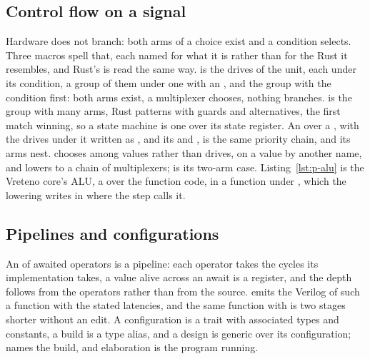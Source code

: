\documentclass[journal,9pt]{IEEEtran}
\begin{document}
\subsection{Control flow on a signal}

Hardware does not branch: both arms of a choice exist and a
condition selects. Three macros spell that, each named for what it
is rather than for the Rust it resembles, and Rust's  is
read the same way.  is the drives
of the unit, each under its condition, a group of them under one
with an , and  the group
with the condition first: both arms exist, a multiplexer chooses,
nothing branches.  is the group with many arms, Rust
patterns with
guards and alternatives, the first match winning, so a state machine
is one  over its state register. An  over a
, with the drives under it written as , and
its  and , is the same priority chain, and
its arms nest.  chooses among values rather than
drives,  on a value by another name, and lowers to a
chain of multiplexers;  is its two-arm case. Listing~\ref{lst:p-alu} is the Vreteno core's ALU, a
 over the function code, in a function under
\code{\#[lower]}, which the lowering writes in where the step calls
it.



\subsection{Pipelines and configurations}

An  of awaited operators is a pipeline: each operator
takes the cycles its implementation takes, a value alive across an
await is a register, and the depth follows from the operators rather
than from the source. \code{\#[pipeline(mul = 3, add = 1)]} emits the
Verilog of such a function with the stated latencies, and the same
function with  is two stages shorter without an edit. A
configuration is a trait with associated types and constants, a
build is a type alias, and a design is generic over its
configuration;  names the build, and elaboration is the
program running.
\end{document}
